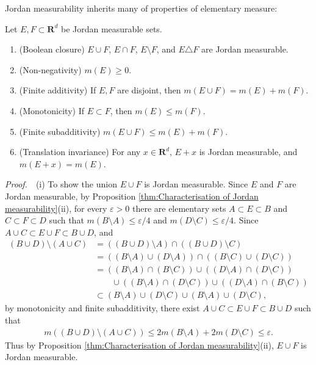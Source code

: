 \documentclass{book}
\theoremstyle{defstyle}
\theoremstyle{thmstyle}
\newcommand{\pff}{\noindent\emph{Proof.}~~}
\newcounter{Proposition}[section]
\begin{document}
Jordan measurability inherits many of properties of elementary measure:

\begin{proposition}\label{thm:the properties of jordan measure}
    Let $E, F \subset \mathbf{R}^d$ be Jordan measurable sets.
    \begin{enumerate}
        \item (Boolean closure) $E \cup F$, $E \cap F$, $E \setminus F$, and $E \triangle F$ are Jordan measurable.
        \item (Non-negativity) $m(E) \geq 0$.
        \item (Finite additivity) If $E, F$ are disjoint, then $m(E \cup F) = m(E) + m(F)$.
        \item (Monotonicity) If $E \subset F$, then $m(E) \leq m(F)$.
        \item (Finite subadditivity) $m(E \cup F) \leq m(E) + m(F)$.
        \item (Translation invariance) For any $x \in \mathbf{R}^d$, $E + x$ is Jordan measurable, and $m(E + x) = m(E)$.
    \end{enumerate}
\end{proposition}

\pff (i) To show the union $E \cup F$ is Jordan measurable. Since $E$ and $F$ are Jordan measurable, by Proposition \ref{thm:Characterisation of Jordan measurability}(ii), for every $\varepsilon > 0$ there are elementary sets $A \subset E \subset B$ and $C \subset F \subset D$ such that $m(B \setminus A) \leq \varepsilon/4$ and $m(D \setminus C) \leq \varepsilon/4$. Since $A \cup C \subset E \cup F \subset B \cup D$, and
    \begin{align*}
        (B \cup D) \setminus (A \cup C)
        &= ((B \cup D) \setminus A) \cap ((B \cup D) \setminus C)\\
        &= ((B \setminus A) \cup (D \setminus A)) \cap ((B \setminus C) \cup (D \setminus C))\\
        &= ((B \setminus A) \cap (B \setminus C))
        \cup ((D \setminus A) \cap (D \setminus C))\\
        &\qquad\cup ((B \setminus A) \cap (D \setminus C))
        \cup ((D \setminus A) \cap (B \setminus C))\\
        &\subset (B \setminus A) \cup (D \setminus C) \cup (B \setminus A) \cup (D \setminus C),
    \end{align*}
by monotonicity and finite subadditivity, there exist $A \cup C \subset E \cup F \subset B \cup D$ such that
    \begin{align*}
        m((B \cup D) \setminus (A \cup C))
        \leq 2m(B \setminus A) + 2m(D \setminus C) \leq \varepsilon.
    \end{align*}
Thus by Proposition \ref{thm:Characterisation of Jordan measurability}(ii), $E \cup F$ is Jordan measurable.
\end{document}
